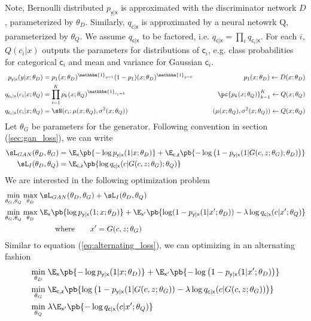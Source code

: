 \documentclass[11pt]{article}
\newcommand\ry{\ensuremath{\mathsf{y}}}
\newcommand\rx{\ensuremath{\mathsf{x}}}
\newcommand\rc{\ensuremath{\mathsf{c}}}
\newcommand\rz{\ensuremath{\mathsf{z}}}
\begin{document}
Note, Bernoulli distributed $p_{\ry|\rx}$ is approximated with the discriminator network $D$, parameterized by $\theta_D$. Similarly, $q_{\rc|\rx}$ is approximated by a neural netowrk Q, parameterized by $\theta_Q$. We assume $q_{\rc|\rx}$ to be factored, i.e. $q_{\rc|\rx} = \prod_i q_{\rc_i|\rx}$. For each $i$, $Q(c_i|x)$ outputs the parameters for distributions of $\rc_i$, e.g. class probabilities for categorical $\rc_i$ and mean and variance for Gaussian $\rc_i$.
\begin{align*}
    p_{\ry|\rx}(y|x;\theta_D) 
        &= p_1(x;\theta_D)^{\mathbbm{1}_{y=1}} ( 1-p_1 ) (x;\theta_D)^{\mathbbm{1}_{y=0}}
        &\quad\quad p_1(x;\theta_D) \leftarrow D(x;\theta_D) \\
    q_{\rc_i|\rx}(c_i|x;\theta_Q) 
        &= \prod_{i=1}^K p_k(x;\theta_Q)^{\mathbbm{1}_{c_i=k}}
        &\quad\quad \pc{p_k(x;\theta_Q)}_{k=1}^K \leftarrow Q(x;\theta_Q) \\
    q_{\rc_i|\rx}(c_i|x;\theta_Q) 
        &= \sN(c_i; \mu(x;\theta_Q), \sigma^2(x;\theta_Q))
        &\quad\quad (\mu(x;\theta_Q), \sigma^2(x;\theta_Q)) \leftarrow Q(x;\theta_Q)
\end{align*}
Let $\theta_G$ be parameters for the generator. Following convention in section (\ref{sec:gan_loss}), we can write
\begin{align*}
    \sL_{GAN}(\theta_D,\theta_G) 
        &= \E_{\rx}\pb{ -\log p_{\ry|\rx}(1|x;\theta_D) } +  \E_{\rc,\rz}\pb{ -\log \left( 1- p_{\ry|\rx}(1|G(c,z;\theta_G);\theta_D) \right) }    \\
    \sL_{I}(\theta_D,\theta_Q)
        &= \E_{\rc,\rz}\pb{ \log q_{\rc|\rx}(c|G(c,z;\theta_G);\theta_Q) } 
\end{align*}
We are interested in the following optimization problem
\begin{align*}
    \min_{\theta_G,\theta_Q} \max_{\theta_D} \;
        &\sL_{GAN}(\theta_D,\theta_G) + \sL_{I}(\theta_D,\theta_Q) \\
    \min_{\theta_G,\theta_Q} \max_{\theta_D} \;
        &\E_{\rx}\pb{\log p_{\ry|\rx}(1;x;\theta_D)} + \E_{\rx'} \pb{ \log (1-p_{\ry|\rx}(1|x';\theta_D))- \lambda \log q_{\rc|\rx}(c|x';\theta_Q) }\\
        &\quad\quad\text{where}\quad\quad x' = G(c,z;\theta_G)
\end{align*}
Similar to equation (\ref{eq:alternating_loss}), we can optimizing in an alternating fashion
\begin{align*}
    \min_{\theta_D} \;
        &\E_{\rx}\pb{ -\log p_{\ry|\rx}(1|x;\theta_D) } + \E_{\rx'}\pb{ -\log \left( 1- p_{\ry|\rx}(1|x';\theta_D) \right) }  \\
    \min_{\theta_G} \;
        &\E_{\rc,\rz}\pb{ \log \left( 1- p_{\ry|\rx}(1|G(c,z;\theta_G)) - \lambda \log q_{\rc|\rx}(c|G(c,z;\theta_G))  \right)  } \\
    \min_{\theta_Q} \;
        &\lambda \E_{\rx'}\pb{ -\log q_{\rc|\rx}(c|x';\theta_Q) }
\end{align*}
\end{document}
